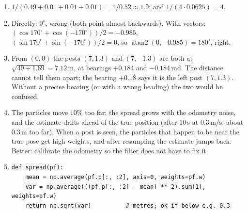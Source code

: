 \begin{enumerate}[label=\textbf{\ansnum.\arabic*}]
  \item $1/(0.49+0.01+0.01+0.01)=1/0.52\approx1.9$; and $1/(4\cdot0.0625)=4$.
  \item Directly: $0^\circ$, wrong (both point almost backwards). With vectors: $(\cos170^\circ+\cos(-170^\circ))/2=-0.985$, $(\sin170^\circ+\sin(-170^\circ))/2=0$, so $\operatorname{atan2}(0,-0.985)=180^\circ$, right.
  \item From $(0,0)$ the posts $(7,1.3)$ and $(7,-1.3)$ are both at $\sqrt{49+1.69}=7.12$\,m, at bearings $+0.184$ and $-0.184$\,rad. The distance cannot tell them apart; the bearing $+0.18$ says it is the left post $(7,1.3)$. Without a precise bearing (or with a wrong heading) the two would be confused.
  \item The particles move $10\%$ too far; the spread grows with the odometry noise, and the estimate drifts ahead of the true position (after $10$\,s at $0.3$\,m/s, about $0.3$\,m too far). When a post is seen, the particles that happen to be near the true pose get high weights, and after resampling the estimate jumps back. Better: calibrate the odometry so the filter does not have to fix it.
  \item
\begin{verbatim}
def spread(pf):
    mean = np.average(pf.p[:, :2], axis=0, weights=pf.w)
    var = np.average(((pf.p[:, :2] - mean) ** 2).sum(1), weights=pf.w)
    return np.sqrt(var)          # metres; ok if below e.g. 0.3
\end{verbatim}
\end{enumerate}
